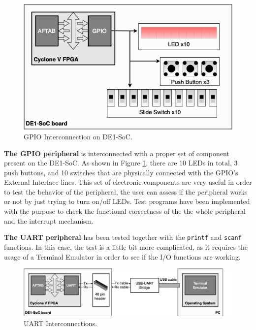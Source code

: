 \begin{figure}[h]
\centering
\vspace{0.5cm}
\includegraphics[scale=0.6]{./images/gpiotesting}
\caption{GPIO Interconnection on DE1-SoC.}
\label{fig:gpiotesting} %
\end{figure}

\textbf{The GPIO peripheral} is interconnected with a proper set of component present on the DE1-SoC. As shown in Figure \ref{fig:gpiotesting}, there are 10 LEDs in total, 3 push buttons, and 10 switches that are physically connected with the GPIO's External Interface lines. This set of electronic components are very useful in order to test the behavior of the peripheral, the user can assess if the peripheral works or not by just trying to turn on/off LEDs. Test programs have been implemented with the purpose to check the functional correctness of the the whole peripheral and the interrupt mechanism.

\textbf{The UART peripheral} has been tested together with the \texttt{printf} and \texttt{scanf} functions. In this case, the test is a little bit more complicated, as it requires the usage of a Terminal Emulator in order to see if the I/O functions are working. 

\begin{figure}[h]
\vspace{0.5cm}
\includegraphics[scale=0.5]{./images/uarttesting}
\caption{UART Interconnections.}
\label{fig:uarttesting} %
\end{figure}

